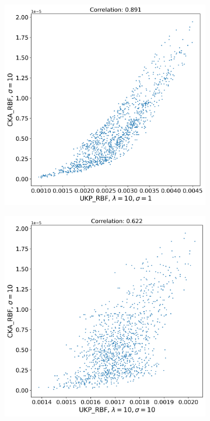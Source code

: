 \documentclass{article}
\theoremstyle{plain}
\begin{document}
\begin{figure}[!h]
    \begin{subfigure}[b]{0.45\textwidth}
        \includegraphics[width=\textwidth]{Appendix figures/mnist_experiments/Correlation/Correlation plot for CKA_dist_RBF_1.000000e+01 and UKP_dist_RBF_1.000000e+01_1.000000e+00.png}
    \end{subfigure}
    \hfill
    \begin{subfigure}[b]{0.45\textwidth}
        \includegraphics[width=\textwidth]{Appendix figures/mnist_experiments/Correlation/Correlation plot for CKA_dist_RBF_1.000000e+01 and UKP_dist_RBF_1.000000e+01_1.000000e+01.png}
    \end{subfigure}
    

\end{figure}
\end{document}
